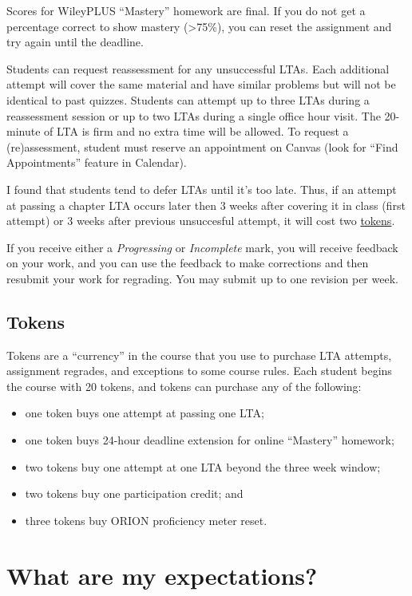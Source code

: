 Scores for WileyPLUS ``Mastery'' homework are final. If you do not get a
percentage correct to show mastery (\textgreater75\%), you can reset the
assignment and try again until the deadline.

Students can request reassessment for any unsuccessful LTAs. Each
additional attempt will cover the same material and have similar
problems but will not be identical to past quizzes. Students can attempt
up to three LTAs during a reassessment session or up to two LTAs during
a single office hour visit. The 20-minute of LTA is firm and no extra
time will be allowed. To request a (re)assessment, student must reserve
an appointment on Canvas (look for ``Find Appointments'' feature in
Calendar).

I found that students tend to defer LTAs until it's too late. Thus, if
an attempt at passing a chapter LTA occurs later then 3 weeks after
covering it in class (first attempt) or 3 weeks after previous
unsuccesful attempt, it will cost two
\protect\hyperlink{tokens}{tokens}.

If you receive either a \emph{Progressing} or \emph{Incomplete} mark,
you will receive feedback on your work, and you can use the feedback to
make corrections and then resubmit your work for regrading. You may
submit up to one revision per week.

\hypertarget{tokens}{%
\subsection{Tokens}\label{tokens}}

Tokens are a ``currency'' in the course that you use to purchase LTA
attempts, assignment regrades, and exceptions to some course rules. Each
student begins the course with 20 tokens, and tokens can purchase any of
the following:

\begin{itemize}
\tightlist
\item
  one token buys one attempt at passing one LTA;
\item
  one token buys 24-hour deadline extension for online ``Mastery''
  homework;
\item
  two tokens buy one attempt at one LTA beyond the three week window;
\item
  two tokens buy one participation credit; and
\item
  three tokens buy ORION proficiency meter reset.
\end{itemize}

\hypertarget{what-are-my-expectations}{%
\section{What are my expectations?}\label{what-are-my-expectations}}

